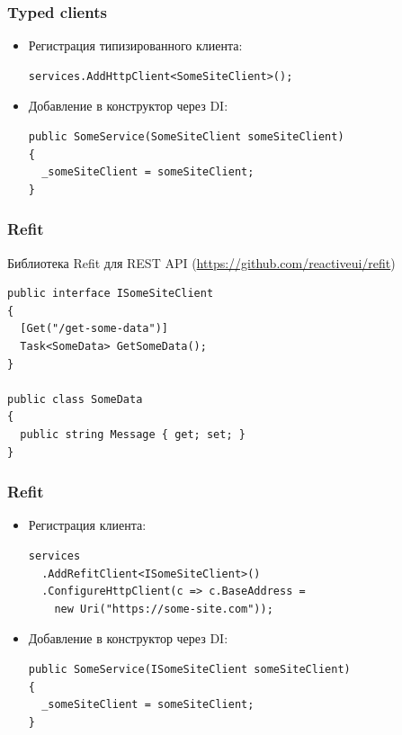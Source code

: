 \documentclass{beamer}
\begin{document}
\begin{frame}[fragile]
\frametitle{Typed clients}
\begin{itemize}
\item<1-> Регистрация типизированного клиента:
\begin{lstlisting}
services.AddHttpClient<SomeSiteClient>();
\end{lstlisting}
\item<2-> Добавление в конструктор через DI:
\begin{lstlisting}
public SomeService(SomeSiteClient someSiteClient)
{
  _someSiteClient = someSiteClient;
}
\end{lstlisting}
\end{itemize}
\end{frame}

\begin{frame}[fragile]
\frametitle{Refit}
Библиотека Refit для REST API (\href{https://github.com/reactiveui/refit}{https://github.com/reactiveui/refit})
\newline
\begin{lstlisting}
public interface ISomeSiteClient
{
  [Get("/get-some-data")]
  Task<SomeData> GetSomeData();
}

public class SomeData
{
  public string Message { get; set; }
}
\end{lstlisting}
\end{frame}

\begin{frame}[fragile]
\frametitle{Refit}
\begin{itemize}
\item<1-> Регистрация клиента:
\begin{lstlisting}
services
  .AddRefitClient<ISomeSiteClient>()
  .ConfigureHttpClient(c => c.BaseAddress = 
    new Uri("https://some-site.com"));
\end{lstlisting}
\item<2-> Добавление в конструктор через DI:
\begin{lstlisting}
public SomeService(ISomeSiteClient someSiteClient)
{
  _someSiteClient = someSiteClient;
}
\end{lstlisting}
\end{itemize}
\end{frame}
\end{document}
